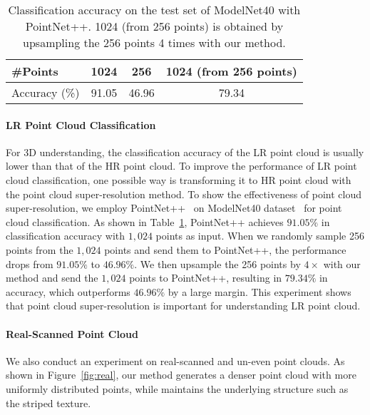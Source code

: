 \documentclass[10pt,twocolumn,letterpaper]{article}
\begin{document}
\begin{table}[!t]
\begin{center}
\begin{tabular}{l|c|c|c}
\hline
\#Points & 1024 & 256 & 1024 (from 256 points) \\
\hline
Accuracy (\%) & 91.05 & 46.96 & 79.34 \\
\hline
\end{tabular}
\end{center}
	\vspace{-1.5em}
	\caption{Classification accuracy on the test set of ModelNet40 with PointNet++. 1024 (from 256 points) is obtained by upsampling the 256 points 4 times with our method.}
	\vspace{-1em}
\label{table:classification}
\end{table}

\vspace{-1em}
\paragraph{LR Point Cloud Classification}
For 3D understanding, the classification accuracy of the LR point cloud is usually lower than that of the HR point cloud.
To improve the performance of LR point cloud classification, one possible way is transforming it to HR point cloud with the point cloud super-resolution method.
To show the effectiveness of point cloud super-resolution, we employ PointNet++~\cite{qi2017pointnet++} on ModelNet40 dataset~\cite{wu20153d} for point cloud classification.
As shown in Table~\ref{table:classification}, PointNet++ achieves $91.05\%$ in classification accuracy with $1,024$ points as input.
When we randomly sample 256 points from the $1,024$ points and send them to PointNet++, the performance drops from $91.05\%$ to $46.96\%$.
We then upsample the 256 points by $4\times$ with our method and send the $1,024$ points to PointNet++, resulting in $79.34\%$ in accuracy, which outperforms $46.96\%$ by a large margin.
This experiment shows that point cloud super-resolution is important for understanding LR point cloud.

\vspace{-1em}
\paragraph{Real-Scanned Point Cloud}
We also conduct an experiment on real-scanned and un-even point clouds.
As shown in Figure~\ref{fig:real}, our method generates a denser point cloud with more uniformly distributed points, while maintains the underlying structure such as the striped texture.
\end{document}
